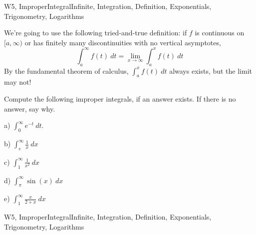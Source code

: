 \begin{tagblock}{W5, ImproperIntegralInfinite, Integration, Definition, Exponentials, Trigonometry, Logarithms}
\begin{question}
	
We're going to use the following tried-and-true definition: if $f$ is continuous on $[a,\infty)$ or has finitely many discontinuities with no vertical asymptotes,
\[
\int_a^{\infty}f(t) \ dt=\lim_{x\to\infty} \int_a^xf(t) \ dt
\]
By the fundamental theorem of calculus, $\int_a^x f(t) \ dt$ always exists, but the limit may not! 

\bigskip



Compute the following improper integrals, if an answer exists. If there is no answer, say why.

\bigskip

a) $\displaystyle\int_0^\infty e^{-t} \ dt$. 

\bigskip

b) $\displaystyle\int_e^{\infty}\frac 1 x \ dx$ 

\bigskip

c) $\displaystyle\int_1^{\infty} \frac 1 {x^2} \ dx$

\bigskip

d) $\displaystyle\int_{\pi}^{\infty}\sin(x) \ dx$

\bigskip

e) $\displaystyle\int_1^{\infty}\frac x {2+x} \ dx$

    
\begin{tags}
        W5, ImproperIntegralInfinite, Integration, Definition, Exponentials, Trigonometry, Logarithms
\end{tags}
    
\begin{diary}
        
\end{diary}
	
\begin{solution}

\end{solution}
	
\end{question}

\end{tagblock}

